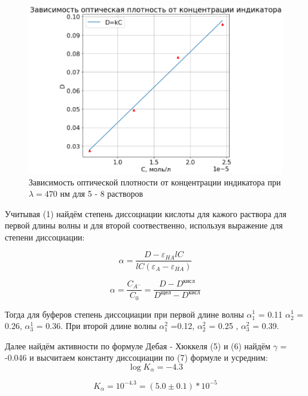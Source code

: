 \documentclass[a4paper,12pt]{article}
\begin{document}
\begin{figure}[H]
    \centering
    \includegraphics[scale=0.75]{5-8.2.png}
    \centering
    \caption{Зависимость оптической плотности от концентрации индикатора при $\lambda = 470$ нм для 5 - 8 растворов}
\end{figure}

Учитывая (1) найдём степень диссоциации кислоты для кажого раствора для первой длины волны и для второй соотвественно, используя выражение для степени диссоциации:

\begin{equation}
    \alpha = \frac{D - \varepsilon_{HA}lC}{lC(\varepsilon_A - \varepsilon_{HA})}
    \nonumber
\end{equation}

\begin{equation}
    \alpha = \frac{C_{A^-}}{C_0} = \frac{D - D^{\text{кисл}}}{D^{\text{щел}} - D^{\text{кисл}}}
    \nonumber
\end{equation}

Тогда для буферов степень диссоциации при первой длине волны $\alpha_1^1$ = 0.11 $\alpha_2^1$ = 0.26, $\alpha_3^1$ = 0.36. При второй длине волны $\alpha_1^2$ =0.12, $\alpha_2^2$ = 0.25     , $\alpha_3^2$ = 0.39.

Далее найдём активности по формуле Дебая - Хюккеля (5) и (6) найдём $\gamma$ = -0.046 и высчитаем константу диссоциации по (7) формуле и усредним:
\begin{equation}
    \log K_\alpha = -4.3
    \nonumber
\end{equation}
    
\begin{equation}
    K_\alpha = 10^{-4.3} = (5.0 \pm 0.1) * 10^{-5} 
    \nonumber
\end{equation}
\end{document}

